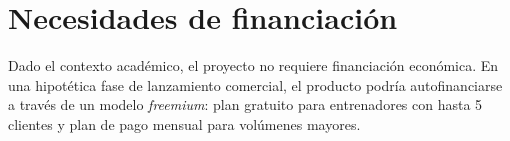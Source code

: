 \section{Necesidades de financiación}

Dado el contexto académico, el proyecto no requiere financiación económica. En una hipotética fase de lanzamiento comercial, el producto podría autofinanciarse a través de un modelo \textit{freemium}: plan gratuito para entrenadores con hasta 5 clientes y plan de pago mensual para volúmenes mayores.
